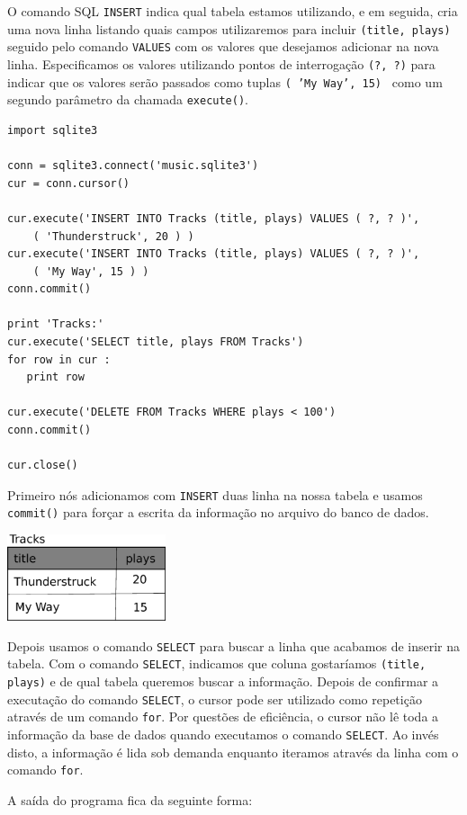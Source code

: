 O comando SQL {\tt INSERT} indica qual tabela estamos utilizando, e em seguida, 
cria uma nova linha listando quais campos utilizaremos para incluir {\tt (title,
  plays)} seguido pelo comando {\tt VALUES} com os valores que desejamos
adicionar na nova linha. Especificamos os valores utilizando pontos de
interrogação {\tt (?, ?)} para indicar que os valores serão passados como
tuplas {\tt ( 'My Way', 15) } como um segundo parâmetro da chamada
{\tt execute()}.

\beforeverb
\begin{verbatim}
import sqlite3

conn = sqlite3.connect('music.sqlite3')
cur = conn.cursor()

cur.execute('INSERT INTO Tracks (title, plays) VALUES ( ?, ? )', 
    ( 'Thunderstruck', 20 ) )
cur.execute('INSERT INTO Tracks (title, plays) VALUES ( ?, ? )', 
    ( 'My Way', 15 ) )
conn.commit()

print 'Tracks:'
cur.execute('SELECT title, plays FROM Tracks')
for row in cur :
   print row

cur.execute('DELETE FROM Tracks WHERE plays < 100')
conn.commit()

cur.close()
\end{verbatim}
\afterverb
%
Primeiro nós adicionamos com {\tt INSERT} duas linha na nossa tabela e
usamos {\tt commit()} para forçar a escrita da informação no arquivo do banco
de dados.

\beforefig
\centerline{\includegraphics[height=1.00in]{figs2/tracks.eps}}
\afterfig

Depois usamos o comando {\tt SELECT} para buscar a linha que acabamos de
inserir na tabela. Com o comando {\tt SELECT}, indicamos que coluna gostaríamos
{\tt (title, plays)} e de qual tabela queremos buscar a informação. Depois
de confirmar a executação do comando {\tt SELECT}, o cursor pode ser utilizado
como repetição através de um comando {\tt for}. Por questões de eficiência, o
cursor não lê toda a informação da base de dados quando executamos o comando
{\tt SELECT}. Ao invés disto, a informação é lida sob demanda enquanto
iteramos através da linha com o comando {\tt for}.

A saída do programa fica da seguinte forma:

